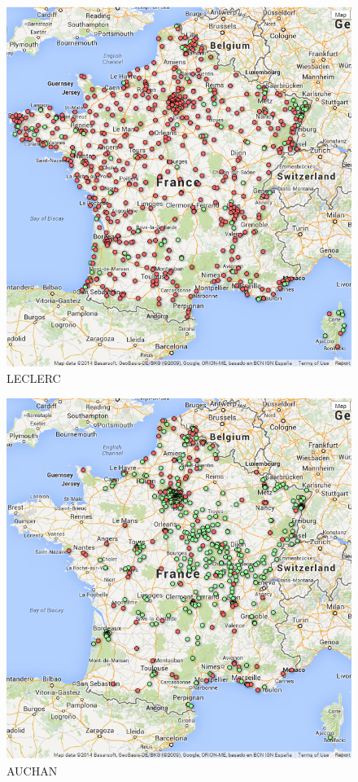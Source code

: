 \documentclass[11pt]{article}
\begin{document}
\begin{figure}[!h]
    \caption{LECLERC}
	\centering
		\includegraphics[width=16cm]{images/LECLERC.png}
\end{figure}

\begin{figure}[!h]
    \caption{AUCHAN}
	\centering
		\includegraphics[width=16cm]{images/AUCHAN.png}
\end{figure}
\end{document}
